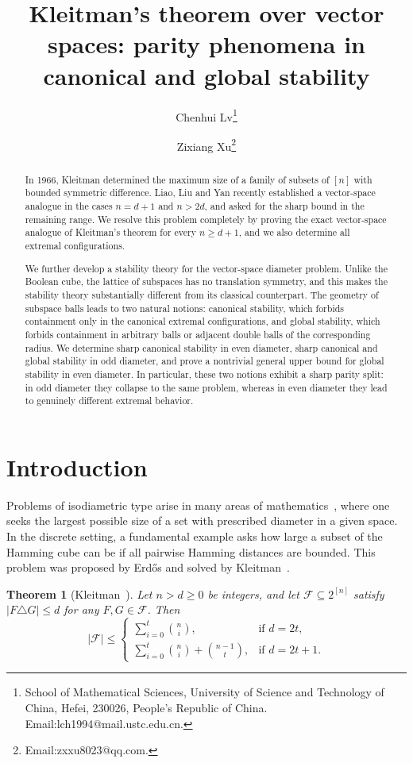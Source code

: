 \documentclass[11pt]{article}
\title{Kleitman's theorem over vector spaces: parity phenomena in canonical and global stability
}
\author{
Chenhui Lv\thanks{
School of Mathematical Sciences, University of Science and Technology of China, Hefei, 230026, People's Republic of China. Email:lch1994@mail.ustc.edu.cn.}
\and
Zixiang Xu\thanks{Email:zxxu8023@qq.com.}
}
\date{}
\newtheorem{theorem}{Theorem}[section]
\theoremstyle{definition}
\begin{document}
\maketitle
\begin{abstract}
In 1966, Kleitman determined the maximum size of a family of subsets of $[n]$ with bounded symmetric difference. Liao, Liu and Yan recently established a vector-space analogue in the cases $n=d+1$ and $n>2d$, and asked for the sharp bound in the remaining range. We resolve this problem completely by proving the exact vector-space analogue of Kleitman's theorem for every $n\ge d+1$, and we also determine all extremal configurations.

We further develop a stability theory for the vector-space diameter problem. Unlike the Boolean cube, the lattice of subspaces has no translation symmetry, and this makes the stability theory substantially different from its classical counterpart. The geometry of subspace balls leads to two natural notions: canonical stability, which forbids containment only in the canonical extremal configurations, and global stability, which forbids containment in arbitrary balls or adjacent double balls of the corresponding radius. We determine sharp canonical stability in even diameter, sharp canonical and global stability in odd diameter, and prove a nontrivial general upper bound for global stability in even diameter. In particular, these two notions exhibit a sharp parity split: in odd diameter they collapse to the same problem, whereas in even diameter they lead to genuinely different extremal behavior.
\end{abstract}


\section{Introduction} 
Problems of isodiametric type arise in many areas of mathematics~\cite{1992CombinatoricaACZ,1998AMAR,1993DMBL,1990DCGDK,1980SIAMADMFF}, where one seeks the largest possible size of a set with prescribed diameter in a given space. In the discrete setting, a fundamental example asks how large a subset of the Hamming cube can be if all pairwise Hamming distances are bounded. This problem was proposed by Erd\H{o}s and solved by Kleitman~\cite{K1966}.
\begin{theorem}[Kleitman~\cite{K1966}]\label{thm:Kleitman}
Let $n>d\ge 0$ be integers, and let $\mathcal F\subseteq 2^{[n]}$ satisfy
$|F\triangle G|\le d$ for any \(F,G\in\mathcal{F}\).
Then
\[
|\mathcal F|\le
\begin{cases}
\displaystyle \sum_{i=0}^{t}\binom{n}{i}, & \text{if } d=2t,\\[2mm]
\displaystyle \sum_{i=0}^{t}\binom{n}{i}+\binom{n-1}{t}, & \text{if } d=2t+1.
\end{cases}
\]
\end{theorem}
\end{document}
